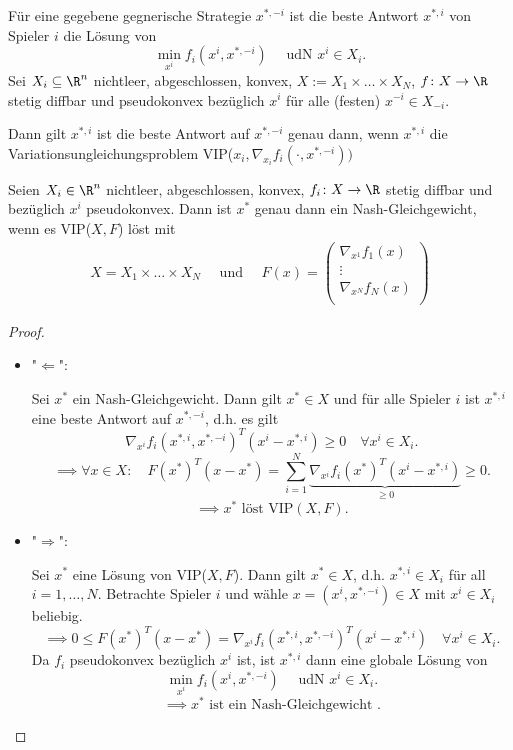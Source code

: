 Für eine gegebene gegnerische Strategie $x^{*,-i}$ ist die beste Antwort $x^{*,i}$ von Spieler $i$ die Lösung von \[
	\min\limits_{x^{i}}f_{i}(x^{i},x^{*,-i}) \quad \text{ udN }x^{i} \in X_{i}
.\]
Sei $X_{i}\subseteq \R^{n}$ nichtleer, abgeschlossen, konvex, $X:= X_1 \times \ldots \times X_{N}$, $f \colon X \rightarrow \R $ stetig diffbar und pseudokonvex bezüglich $x^{i}$ für alle (festen) $x^{-i} \in X_{-i}$.

Dann gilt $x^{*, i}$ ist die beste Antwort auf $x^{*,-i}$ genau dann, wenn $x^{*,i}$ die Variationsungleichungsproblem VIP($x_{i}, \nabla _{x_{i}}f_{i}(\cdot, x^{*,-i}))$
\begin{satz}
	Seien $X_{i} \in \R^{n}$ nichtleer, abgeschlossen, konvex, $f_{i}\colon X \rightarrow \R$ stetig diffbar und bezüglich $x^{i}$ pseudokonvex. Dann ist ${x}^{*}$ genau dann ein Nash-Gleichgewicht, wenn es VIP($X,F$) löst mit 
	\begin{align*}
		X=X_1 \times \ldots \times X_{N} \quad \text{ und }\quad F(x)= \begin{pmatrix}
			\nabla _{x^{1}}f_{1}(x) \\
			\vdots \\
			\nabla _{x^{N}}f_{N}(x) \\
		\end{pmatrix}
	\end{align*}
\end{satz}

\begin{proof}
	\begin{itemize}
		\item "$\Longleftarrow$":

			Sei ${x}^{*}$ ein Nash-Gleichgewicht. Dann gilt ${x}^{*} \in X$ und für alle Spieler $i$ ist $x^{*,i}$ eine beste Antwort auf $x^{*,-i}$, d.h. es gilt
			\[
				\nabla _{x^{i}}f_{i}(x^{*,i}, x^{*,-i})^{T}(x^{i}-x^{*,i})\geq 0 \quad \forall x^{i} \in X_{i}
			.\] 
			\[
				\implies\forall x \in X : \quad F({x}^{*})^{T}(x-{x}^{*}) = \sum_{i=1}^{N}{\underbrace{\nabla _{x^{i}} f_{i}({x}^{*})^{T}(x^{i}- x^{*,i})}_{\geq  0} }\geq  0
			.\] 
			\[
			\implies {x}^{*} \text{ löst VIP}(X,F)
			.\] 
		\item "$\Longrightarrow$":

			Sei ${x}^{*}$ eine Lösung von VIP($X,F$). Dann gilt ${x}^{*}\in X$, d.h. $x^{*,i} \in X_{i}$ für all $i=1, \ldots, N$. Betrachte Spieler $i$ und wähle $x=(x^{i}, x^{*,-i})\in X$  mit $x^{i} \in X_{i}$ beliebig.
			\[
				\implies 0 \leq  F({x}^{*})^{T}(x-{x}^{*}) = \nabla _{x^{i}}f_{i}(x^{*,i}, x^{*,-i})^{T}(x^{i}- x^{*,i}) \quad \forall x^{i} \in X_{i}
			.\] 
			Da $f_{i}$ pseudokonvex bezüglich $x^{i}$ ist, ist $x^{*,i}$ dann eine globale Lösung von
			\[
				\min\limits_{x^{i}}f_{i}(x^{i}, x^{*,-i}) \quad \text{ udN } x^{i} \in X_{i}
			.\] 
			\[
			\implies {x}^{*} \text{ ist ein Nash-Gleichgewicht }
			.\] 
	\end{itemize}
\end{proof}

